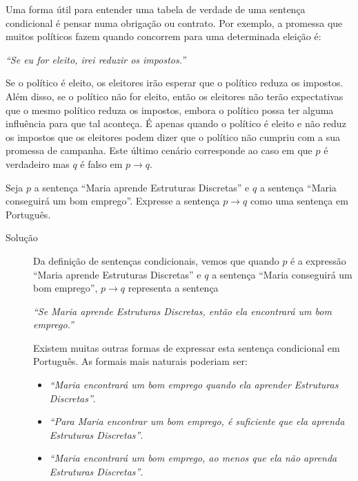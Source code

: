 Uma forma útil para entender uma tabela de verdade de uma sentença condicional é
pensar numa obrigação ou contrato. Por exemplo, a promessa que muitos políticos
fazem quando concorrem para uma determinada eleição é:

\begin{center}\emph{``Se eu for eleito, irei reduzir os impostos.''}\end{center}

Se o político é eleito, os eleitores irão esperar que o político reduza os
impostos. Além disso, se o político não for eleito, então os eleitores não
terão expectativas que o mesmo político reduza os impostos, embora o
político possa ter alguma influência para que tal aconteça. É apenas quando o político é
eleito e não reduz os impostos que os eleitores podem dizer que o político não
cumpriu com a sua promessa de campanha. Este último cenário corresponde ao caso
em que $p$ é verdadeiro mas $q$ é falso em $p \to q$.

\label{exem16}
\begin{exmp}
Seja $p$ a sentença ``Maria aprende Estruturas Discretas'' e
$q$ a sentença ``Maria conseguirá um bom emprego''. Expresse a sentença $p
\to q$ como uma sentença em Português.
\end{exmp}


\begin{description}
	\item[Solução] Da definição de sentenças condicionais, vemos que quando $p$ é a
	expressão ``Maria aprende Estruturas Discretas'' e $q$ a sentença ``Maria
	conseguirá um bom emprego'', $p \to q$ representa a sentença
	\begin{center}\emph{``Se Maria aprende Estruturas Discretas, então ela
	encontrará um bom emprego.''}\end{center}
	
Existem muitas outras formas de expressar esta sentença condicional em
Português. As formais mais naturais poderiam ser:
	\begin{itemize}
	 	\item \emph{``Maria encontrará um bom emprego quando ela aprender Estruturas
Discretas''}.
		\item \emph{``Para Maria encontrar um bom emprego, é suficiente que ela
	aprenda Estruturas Discretas''}.
		\item \emph{``Maria encontrará um bom emprego, ao menos que ela não aprenda
Estruturas Discretas''}.
	\end{itemize}
\end{description}

